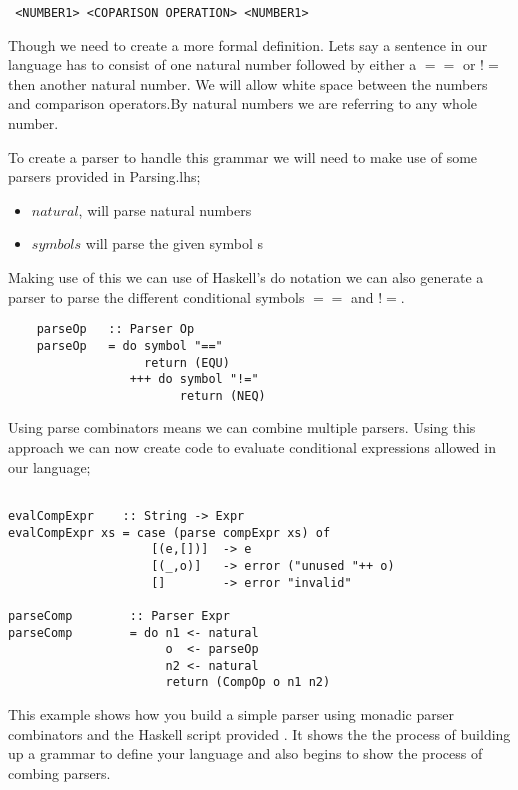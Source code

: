 \begin{lstlisting}
 <NUMBER1> <COPARISON OPERATION> <NUMBER1>
\end{lstlisting}   	

Though we need to create a more formal definition. Lets say a sentence in our language has to consist of one natural number followed by either a $==$ or $!=$ then another natural number. We will allow white space between the numbers and comparison operators.By natural numbers we are referring to any whole number. 

To create a parser to handle this grammar we will need to make use of some parsers provided in Parsing.lhs;

\begin{itemize}
\item $natural$, will parse natural numbers
\item $symbol s$ will parse the given symbol s 
\end{itemize}

Making use of this we can use of Haskell's do notation we can also generate a parser to parse the different conditional symbols $==$ and $!=$. 

\begin{lstlisting}
	parseOp   :: Parser Op
	parseOp   = do symbol "=="
	               return (EQU)
        	     +++ do symbol "!="
	                    return (NEQ) 
\end{lstlisting} 

Using parse combinators means we can combine multiple parsers. Using this approach we can now create code to evaluate conditional expressions allowed in our language;

\begin{lstlisting}

evalCompExpr    :: String -> Expr
evalCompExpr xs = case (parse compExpr xs) of
                    [(e,[])]  -> e
                    [(_,o)]   -> error ("unused "++ o)
                    []        -> error "invalid"

parseComp        :: Parser Expr	
parseComp        = do n1 <- natural
                      o  <- parseOp 
                      n2 <- natural
                      return (CompOp o n1 n2)  
\end{lstlisting}

This example shows how you build a simple parser using monadic parser combinators and the Haskell script provided %
. It shows the the process of building up a grammar to define your language and also begins to show the process of combing parsers. 



